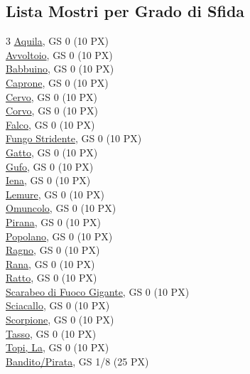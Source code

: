 %

\pagebreak

\subsection{Lista Mostri per Grado di Sfida}

\begin{multicols}{3}
{\small
\noindent\hyperlink{Aquila}{Aquila}, GS 0 (10 PX)\\
\hyperlink{Avvoltoio}{Avvoltoio}, GS 0 (10 PX)\\
\hyperlink{Babbuino}{Babbuino}, GS 0 (10 PX)\\
\hyperlink{Caprone}{Caprone}, GS 0 (10 PX)\\
\hyperlink{Cervo}{Cervo}, GS 0 (10 PX)\\
\hyperlink{Corvo}{Corvo}, GS 0 (10 PX)\\
\hyperlink{Falco}{Falco}, GS 0 (10 PX)\\
\hyperlink{Fungo Stridente}{Fungo Stridente}, GS 0 (10 PX)\\
\hyperlink{Gatto}{Gatto}, GS 0 (10 PX)\\
\hyperlink{Gufo}{Gufo}, GS 0 (10 PX)\\
\hyperlink{Iena}{Iena}, GS 0 (10 PX)\\
\hyperlink{Lemure}{Lemure}, GS 0 (10 PX)\\
\hyperlink{Omuncolo}{Omuncolo}, GS 0 (10 PX)\\
\hyperlink{Pirana}{Pirana}, GS 0 (10 PX)\\
\hyperlink{Popolano}{Popolano}, GS 0 (10 PX)\\
\hyperlink{Ragno}{Ragno}, GS 0 (10 PX)\\
\hyperlink{Rana}{Rana}, GS 0 (10 PX)\\
\hyperlink{Ratto}{Ratto}, GS 0 (10 PX)\\
\hyperlink{Scarabeo di Fuoco Gigante}{Scarabeo di Fuoco Gigante}, GS 0 (10 PX)\\
\hyperlink{Sciacallo}{Sciacallo}, GS 0 (10 PX)\\
\hyperlink{Scorpione}{Scorpione}, GS 0 (10 PX)\\
\hyperlink{Tasso}{Tasso}, GS 0 (10 PX)\\
\hyperlink{Topi, La}{Topi, La}, GS 0 (10 PX)\\
\hyperlink{Bandito/Pirata}{Bandito/Pirata}, GS 1/8 (25 PX)\\
}
\end{multicols}
